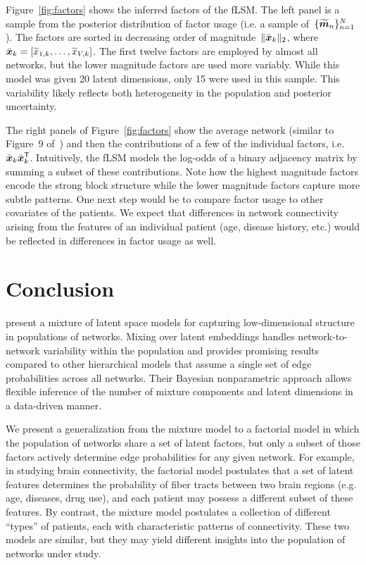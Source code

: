 Figure~\ref{fig:factors} shows the inferred factors of the fLSM.
The left panel is a sample from the posterior distribution of factor
usage (i.e. a sample of~$\{\widetilde{\boldsymbol{m}}_n\}_{n=1}^N$). The factors
are sorted in decreasing order of magnitude~$\|\bar{\boldsymbol{x}}_k\|_2$,
where~${\bar{\boldsymbol{x}}_k = \left[ \widetilde{x}_{1,k}, \ldots, \widetilde{x}_{V,k} \right]}$.
The first twelve factors are employed by almost all networks,
but the lower magnitude factors are used more variably.
While this model was given 20 latent dimensions, only 15 were used
in this sample. 
This variability likely reflects both heterogeneity
in the population and posterior uncertainty.

The right panels of Figure~\ref{fig:factors} show the average network
(similar to Figure~9 of~\citet{durante2016nonparametric}) and then the
contributions of a few of the individual factors, i.e.~${\bar{\boldsymbol{x}}_k \bar{\boldsymbol{x}}_k^{\mathsf{T}}}$.
Intuitively, the fLSM models the log-odds of a binary adjacency matrix
by summing a subset of these contributions.  Note how the highest
magnitude factors encode the strong block structure while the
lower magnitude factors capture more subtle patterns. One
next step would be to compare factor usage to other covariates of the
patients.  We expect that differences in network connectivity
arising from the features of an individual patient (age, disease history,
etc.) would be reflected in differences in factor usage as well.

\section{Conclusion}
\citet{durante2016nonparametric} present a mixture of latent space
models for capturing low-dimensional structure in populations of
networks.  Mixing over latent embeddings handles network-to-network
variability within the population and provides promising results
compared to other hierarchical models that assume a single set of
edge probabilities across all networks.  Their Bayesian
nonparametric approach allows flexible inference of the number of
mixture components and latent dimensions in a data-driven manner.

We present a generalization from the mixture
model to a factorial model in which the population of
networks share a set of latent factors, but only a subset of those
factors actively determine edge probabilities for any given network.
For example, in studying brain connectivity, the factorial model postulates
that a set of latent features determines the probability of fiber
tracts between two brain regions (e.g. age, diseases, drug use), and
each patient may possess a different subset of these features. By contrast,
the mixture model postulates a collection of different ``types'' of
patients, each with characteristic patterns of connectivity.
These two models are similar, but they may yield different
insights into the population of networks under study.

